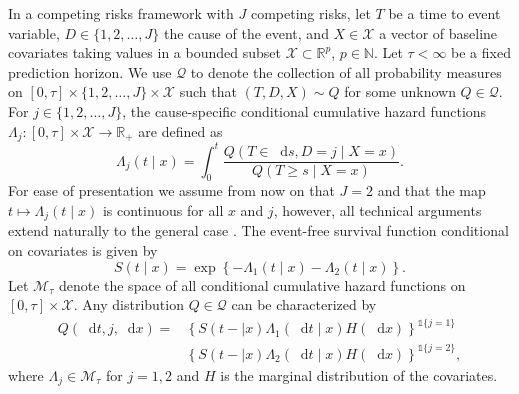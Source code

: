 \documentclass[alpha-refs]{wiley-article}
\newcommand{\R}{\mathbb{R}}
\newcommand{\N}{\mathbb{N}}
\newcommand*\diff{\mathop{}\!\mathrm{d}}
\newcommand{\1}{\mathbb{1}} %
\begin{document}
In a competing risks framework \citep{andersen2012statistical} with
\(J\) competing risks, let \( T\) be a time to event variable,
\(D\in\{1,2,\dots,J\}\) the cause of the event, and $X \in
\mathcal{X}$ a vector of baseline covariates taking values in a
bounded subset \( \mathcal{X} \subset \R^p \), \( p\in\N \). Let
$\tau< \infty$ be a fixed prediction horizon. We use \(\mathcal{Q} \)
to denote the collection of all probability measures on \( [0,\tau]
\times \{1,2,\dots,J\}\times \mathcal{X} \) such that \( (T, D, X) \sim Q \)
for some unknown \( Q \in \mathcal{Q} \). For \(j\in\{1,2,
\dots,J\}\), the cause-specific conditional cumulative hazard
functions \( \Lambda_{j} \colon [0, \tau] \times \mathcal{X}
\rightarrow \R_+ \) are defined as
\begin{equation*}
  \Lambda_{j}(t \mid x) = \int_0^t\frac{  Q(T \in \diff s, D=j \mid X=x )}{Q(T \geq s \mid X=x )}.
\end{equation*} For ease of presentation we assume from now on that
\(J=2\) and that the map \( t\mapsto \Lambda_j(t \mid x) \) is
continuous for all \( x \) and \( j \), however, all technical
arguments extend naturally to the general case
\citep{andersen2012statistical}.  The event-free survival function
conditional on covariates is given by
\begin{equation}
  \label{eq:surv-def}
  S(t \mid x)=\exp\left\{-\Lambda_{1}(t \mid x)-\Lambda_{2}(t \mid x)\right\}.
\end{equation}
Let \( \mathcal{M}_{\tau}\) denote the space of all conditional
cumulative hazard functions on \( [0,\tau] \times\mathcal{X}\). Any
distribution \( Q \in \mathcal{Q} \) can be characterized by
\begin{equation*}
  \label{eq:parametrizeQ}
  \begin{split}
    Q(\diff t,j,\diff x)=& \left\{S(t- \mid x)\Lambda_1(\diff t \mid x)H(\diff x)\right\}^{\1{\{j=1\}}}\\
                         &  \left\{S(t- \mid x)\Lambda_2(\diff t \mid x)H(\diff x)\right\}^{\1{\{j=2\}}},
  \end{split}
\end{equation*}
where \(\Lambda_{j} \in \mathcal{M}_{\tau}\) for \(j=1,2\) and \(H\) is the marginal
distribution of the covariates.
\end{document}
